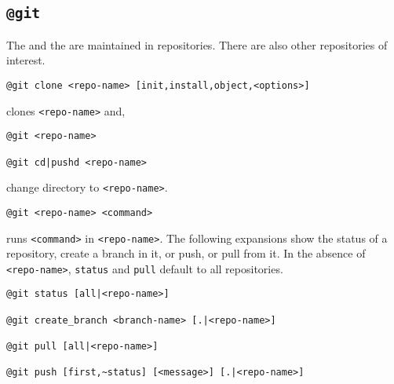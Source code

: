 \subsection{\texttt{@git}}
\label{git}

The  and the  are maintained in repositories. There are also other repositories of interest.
%
\begin{verbatim}
@git clone <repo-name> [init,install,object,<options>]
\end{verbatim}
%
clones \texttt{<repo-name>} and,
%
\begin{verbatim}
@git <repo-name>

@git cd|pushd <repo-name>
\end{verbatim}
%
change directory to \texttt{<repo-name>}.
%
\begin{verbatim}
@git <repo-name> <command>
\end{verbatim}
%
runs \texttt{<command>} in \texttt{<repo-name>}. The following expansions show the status of a repository, create a branch in it, or push, or pull from it. In the absence of \texttt{<repo-name>}, \texttt{status} and \texttt{pull} default to all repositories.
%
\begin{verbatim}
@git status [all|<repo-name>]

@git create_branch <branch-name> [.|<repo-name>]

@git pull [all|<repo-name>]

@git push [first,~status] [<message>] [.|<repo-name>]
\end{verbatim}